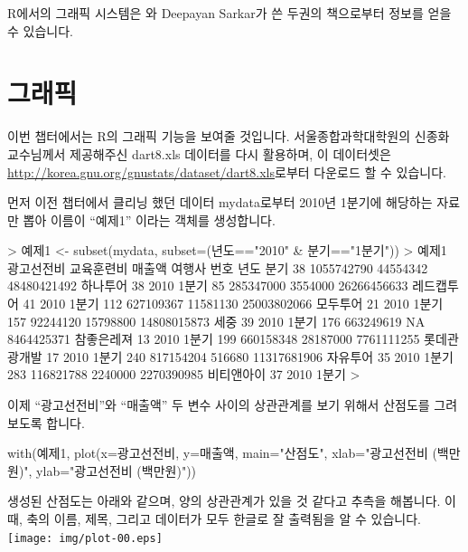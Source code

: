 R에서의 그래픽 시스템은 \citet{Murrell2005}와 Deepayan Sarkar가 쓴 두권의 책으로부터 정보를 얻을 수 있습니다.


\chapter{그래픽}

이번 챕터에서는 R의 그래픽 기능을 보여줄 것입니다.
서울종합과학대학원의 신종화 교수님께서 제공해주신 dart8.xls 데이터를 다시 활용하며, 이 데이터셋은 \href{http://korea.gnu.org/gnustats/dataset/dart8.xls}{http://korea.gnu.org/gnustats/dataset/dart8.xls}로부터 다운로드 할 수 있습니다.

먼저 이전 챕터에서 클리닝 했던 데이터 mydata로부터 2010년 1분기에 해당하는 자료만 뽑아 이름이 ``예제1'' 이라는 객체를 생성합니다.

\begin{Schunk}
\begin{Soutput}	
> 예제1 <- subset(mydata, subset=(년도=="2010" & 분기=="1분기"))
> 예제1 
    광고선전비 교육훈련비      매출액       여행사 번호 년도  분기
38  1055742790   44554342 48480421492     하나투어   38 2010 1분기
85   285347000    3554000 26266456633   레드캡투어   41 2010 1분기
112  627109367   11581130 25003802066     모두투어   21 2010 1분기
157   92244120   15798800 14808015873         세중   39 2010 1분기
176  663249619         NA  8464425371   참좋은레져   13 2010 1분기
199  660158348   28187000  7761111255 롯데관광개발   17 2010 1분기
240  817154204     516680 11317681906     자유투어   35 2010 1분기
283  116821788    2240000  2270390985   비티앤아이   37 2010 1분기
>
\end{Soutput}
\end{Schunk}

이제 ``광고선전비''와 ``매출액'' 두 변수 사이의 상관관계를 보기 위해서 산점도를 그려보도록 합니다.

\begin{Schunk}
\begin{Soutput}	
with(예제1, plot(x=광고선전비, y=매출액, main="산점도", xlab="광고선전비 (백만원)", ylab="광고선전비 (백만원)"))
\end{Soutput}
\end{Schunk}

생성된 산점도는 아래와 같으며, 양의 상관관계가 있을 것 같다고 추측을 해봅니다.
이때, 축의 이름, 제목, 그리고 데이터가 모두 한글로 잘 출력됨을 알 수 있습니다.
\texttt{[image: img/plot-00.eps]}

